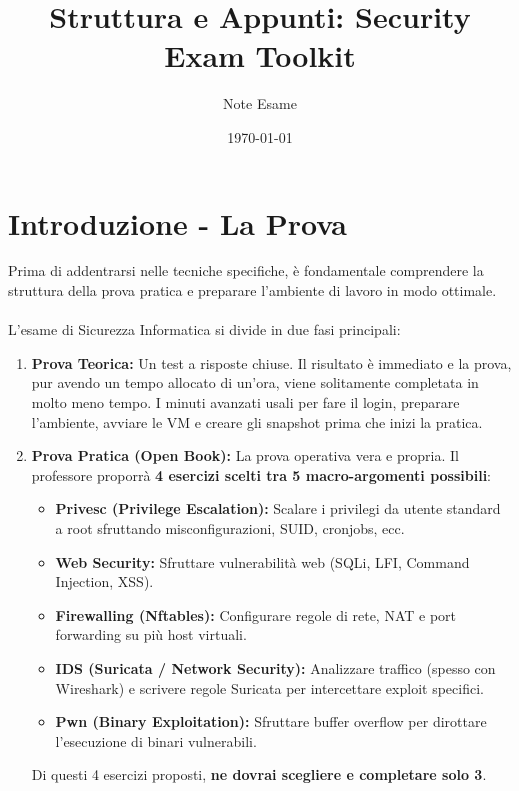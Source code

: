 \documentclass[12pt,a4paper]{report}
\title{\textbf{Struttura e Appunti: Security Exam Toolkit}}
\author{Note Esame}
\date{\today}
\begin{document}
	\maketitle
	\tableofcontents
	\newpage
	
	\chapter*{Introduzione - La Prova}
	
	Prima di addentrarsi nelle tecniche specifiche, è fondamentale comprendere la struttura della prova pratica e preparare l'ambiente di lavoro in modo ottimale.\\\\
	L'esame di Sicurezza Informatica si divide in due fasi principali:
	\begin{enumerate}
		\item \textbf{Prova Teorica:} Un test a risposte chiuse. Il risultato è immediato e la prova, pur avendo un tempo allocato di un'ora, viene solitamente completata in molto meno tempo. I minuti avanzati usali per fare il login, preparare l'ambiente, avviare le VM e creare gli snapshot prima che inizi la pratica.
		\item \textbf{Prova Pratica (Open Book):} La prova operativa vera e propria. Il professore proporrà \textbf{4 esercizi scelti tra 5 macro-argomenti possibili}:
		\begin{itemize}
			\item \textbf{Privesc (Privilege Escalation):} Scalare i privilegi da utente standard a root sfruttando misconfigurazioni, SUID, cronjobs, ecc.
			\item \textbf{Web Security:} Sfruttare vulnerabilità web (SQLi, LFI, Command Injection, XSS).
			\item \textbf{Firewalling (Nftables):} Configurare regole di rete, NAT e port forwarding su più host virtuali.
			\item \textbf{IDS (Suricata / Network Security):} Analizzare traffico (spesso con Wireshark) e scrivere regole Suricata per intercettare exploit specifici.
			\item \textbf{Pwn (Binary Exploitation):} Sfruttare buffer overflow per dirottare l'esecuzione di binari vulnerabili.
		\end{itemize}
		Di questi 4 esercizi proposti, \textbf{ne dovrai scegliere e completare solo 3}.
	\end{enumerate}
	
\end{document}
